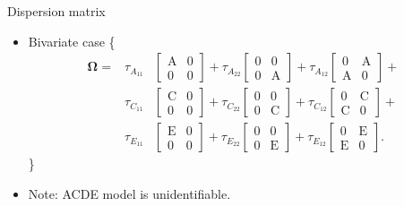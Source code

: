 \documentclass[
  ignorenonframetext,
  serif,
  professionalfont,
  usenames,
  dvipsnames,
  aspectratio = 169]{beamer}
\providecommand{\tightlist}{%
  \setlength{\itemsep}{0pt}\setlength{\parskip}{0pt}}
\renewcommand{\tightlist}{%
  \setlength{\itemsep}{0\baselineskip}
  \setlength{\parskip}{0.25\baselineskip}
}
\begin{document}
\begin{frame}{Dispersion matrix}
\protect\hypertarget{dispersion-matrix}{}
\begin{itemize}
\tightlist
\item
  Bivariate case \small\{ \begin{eqnarray*}
  \boldsymbol{\Omega} = &\tau_{A_{11}} & \nonumber
  \begin{bmatrix}
  \mathrm{A} & \mathrm{0} \\ 
  \mathrm{0} & \mathrm{0}
  \end{bmatrix} + \tau_{A_{22}}
  \begin{bmatrix}
  \mathrm{0} & \mathrm{0} \\ 
  \mathrm{0} & \mathrm{A}
  \end{bmatrix} + \tau_{A_{12}}
  \begin{bmatrix}
  \mathrm{0} & \mathrm{A} \\ 
  \mathrm{A} & \mathrm{0}
  \end{bmatrix} + \\ \nonumber
  & \tau_{C_{11}} &
  \begin{bmatrix}
  \mathrm{C} & \mathrm{0} \\ 
  \mathrm{0} & \mathrm{0}
  \end{bmatrix} + \tau_{C_{22}}
  \begin{bmatrix}
  \mathrm{0} & \mathrm{0} \\ 
  \mathrm{0} & \mathrm{C}
  \end{bmatrix} + \tau_{C_{12}}
  \begin{bmatrix}
  \mathrm{0} & \mathrm{C} \\ 
  \mathrm{C} & \mathrm{0}
  \end{bmatrix} + \\
  &\tau_{E_{11}}& 
  \begin{bmatrix}
  \mathrm{E} & \mathrm{0} \\ 
  \mathrm{0} & \mathrm{0}
  \end{bmatrix} + \tau_{E_{22}}
  \begin{bmatrix}
  \mathrm{0} & \mathrm{0} \\ 
  \mathrm{0} & \mathrm{E}
  \end{bmatrix} + \tau_{E_{12}}
  \begin{bmatrix}
  \mathrm{0} & \mathrm{E} \\ 
  \mathrm{E} & \mathrm{0}
  \end{bmatrix}.
  \end{eqnarray*} \}
\item
  Note: ACDE model is unidentifiable.
\end{itemize}
\end{frame}
\end{document}
